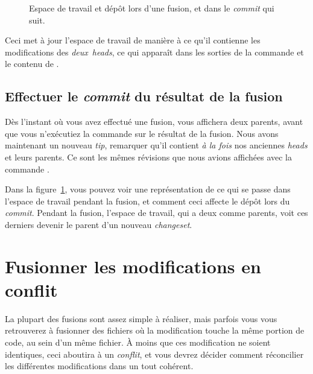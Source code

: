 \begin{figure}[ht]
  \centering
  \caption{Espace de travail et dépôt lors d'une fusion, et dans le
    \textit{commit} qui suit.}
  \label{fig:tour-merge:merge}
\end{figure}

Ceci met à jour l'espace de travail de manière à ce qu'il contienne
les modifications des \emph{deux} \textit{heads}, ce qui apparaît dans
les sorties de la commande  et le contenu de 
. 

\subsection{Effectuer le \textit{commit} du résultat de la fusion}

Dès l'instant où vous avez effectué une fusion,  vous
affichera deux parents, avant que vous n'exécutiez la commande 
 sur le résultat de la fusion.
Nous avons maintenant un nouveau \textit{tip}, remarquer qu'il contient
\emph{à la fois} nos anciennes \textit{heads} et leurs parents. Ce sont
les mêmes révisions que nous avions affichées avec la commande 
.

Dans la figure~\ref{fig:tour-merge:merge}, vous pouvez voir une représentation
de ce qui se passe dans l'espace de travail pendant la fusion, et comment ceci
affecte le dépôt lors du \textit{commit}. Pendant la fusion, l'espace de travail,
qui a deux  comme parents, voit ces derniers devenir le parent
d'un nouveau \textit{changeset}.

\section{Fusionner les modifications en conflit}

La plupart des fusions sont assez simple à réaliser, mais parfois 
vous vous retrouverez à fusionner des fichiers où la modification touche
la même portion de code, au sein d'un même fichier. À moins que ces
modification ne soient identiques, ceci aboutira à un \emph{conflit},
et vous devrez décider comment réconcilier les différentes modifications
dans un tout cohérent. 

